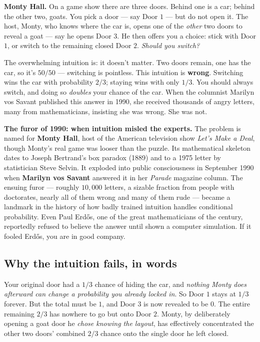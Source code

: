 \begin{paradoxbox}
\textbf{Monty Hall.} On a game show there are three doors. Behind one is a car; behind the
other two, goats. You pick a door --- say Door $1$ --- but do not open it. The host, Monty,
who knows where the car is, opens one of the \emph{other} two doors to reveal a goat ---
say he opens Door $3$. He then offers you a choice: stick with Door $1$, or switch to the
remaining closed Door $2$. \emph{Should you switch?}

The overwhelming intuition is: it doesn't matter. Two doors remain, one has the car, so
it's $50/50$ --- switching is pointless. This intuition is \textbf{wrong}. Switching wins
the car with probability $2/3$; staying wins with only $1/3$. You should always switch,
and doing so \emph{doubles} your chance of the car. When the columnist Marilyn vos Savant
published this answer in 1990, she received thousands of angry letters, many from
mathematicians, insisting she was wrong. She was not.
\end{paradoxbox}

\begin{connectionbox}
\textbf{The furor of 1990: when intuition misled the experts.}
The problem is named for \textbf{Monty Hall}, host of the American television show
\emph{Let's Make a Deal}, though Monty's real game was looser than the puzzle. Its
mathematical skeleton dates to Joseph Bertrand's box paradox (1889) and to a 1975
letter by statistician Steve Selvin. It exploded into public consciousness in September
1990 when \textbf{Marilyn vos Savant} answered it in her \emph{Parade} magazine column.
The ensuing furor --- roughly $10{,}000$ letters, a sizable fraction from people with
doctorates, nearly all of them wrong and many of them rude --- became a landmark in the
history of how badly trained intuition handles conditional probability. Even Paul
Erd\H{o}s, one of the great mathematicians of the century, reportedly refused to believe
the answer until shown a computer simulation. If it fooled Erd\H{o}s, you are in good
company.
\end{connectionbox}

\subsection{Why the intuition fails, in words}

Your original
door had a $1/3$ chance of hiding the car, and \emph{nothing Monty does afterward can
change a probability you already locked in}. So Door $1$ stays at $1/3$ forever. But the
total must be $1$, and Door $3$ is now revealed to be $0$. The entire remaining $2/3$ has
nowhere to go but onto Door $2$. Monty, by deliberately opening a goat door he \emph{chose
knowing the layout}, has effectively concentrated the other two doors' combined $2/3$
chance onto the single door he left closed.

